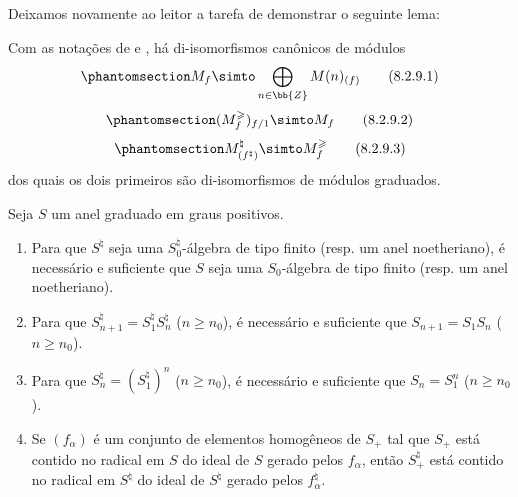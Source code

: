 \documentclass[oneside,10pt]{amsart}
\renewcommand{\geq}{\geqslant}
\let\EGAOriginalLabel\label
\renewcommand{\label}[1]{\phantomsection\EGAOriginalLabel{#1}}
\begin{document}
Deixamos novamente ao leitor a tarefa de demonstrar o seguinte lema:
\begin{lemma}[8.2.9]
\label{II.8.2.9}
Com as notações de  e , há di-isomorfismos canônicos de módulos
\[
\label{II.8.2.9.1}
  M_f \simto \bigoplus_{n\in\bb{Z}} M(n)_{(f)}
\tag{8.2.9.1}
\]
\[
\label{II.8.2.9.2}
  (M_f^\geq)_{f/1} \simto M_f
\tag{8.2.9.2}
\]
\[
\label{II.8.2.9.3}
  M_{(f^\natural)}^\natural \simto M_f^\geq
\tag{8.2.9.3}
\]
dos quais os dois primeiros são di-isomorfismos de módulos graduados.
\end{lemma}

\begin{lemma}[8.2.10]
\label{II.8.2.10}
Seja $S$ um anel graduado em graus positivos.
\begin{enumerate}
  \item[\rm{(i)}] Para que $S^\natural$ seja uma $S_0^\natural$-álgebra de tipo finito (resp. um anel noetheriano), é necessário e suficiente que $S$ seja uma $S_0$-álgebra de tipo finito (resp. um anel noetheriano).
  \item[\rm{(ii)}] Para que $S_{n+1}^\natural = S_1^\natural S_n^\natural$ ($n\geq n_0$), é necessário e suficiente que $S_{n+1}=S_1S_n$ ($n\geq n_0$).
  \item[\rm{(iii)}] Para que $S_n^\natural = (S_1^\natural)^n$ ($n\geq n_0$), é necessário e suficiente que $S_n=S_1^n$ ($n\geq n_0$).
  \item[\rm{(iv)}] Se $(f_\alpha)$ é um conjunto de elementos homogêneos de $S_+$ tal que $S_+$ está contido no radical em $S$ do ideal de $S$ gerado pelos $f_\alpha$, então $S_+^\natural$ está contido no radical em $S^\natural$ do ideal de $S^\natural$ gerado pelos $f_\alpha^\natural$.
\end{enumerate}
\end{lemma}
\end{document}

